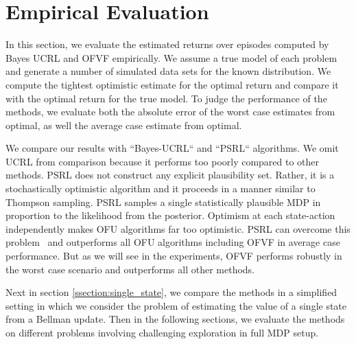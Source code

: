 \documentclass{article}
\theoremstyle{plain}
\theoremstyle{definition}
\begin{document}
\section{Empirical Evaluation} \label{sec:experiments}

In this section, we evaluate the estimated returns over episodes computed by Bayes UCRL and OFVF empirically. We assume a true model of each problem and generate a number of simulated data sets for the known distribution. We compute the tightest optimistic estimate for the optimal return and compare it with the optimal return for the true model. To judge the performance of the methods, we evaluate both the absolute error of the worst case estimates from optimal, as well the average case estimate from optimal.

We compare our results with ``Bayes-UCRL`` and ``PSRL`` algorithms. We omit UCRL from comparison because it performs too poorly compared to other methods. PSRL does not construct any explicit plausibility set. Rather, it is a stochastically optimistic algorithm and it proceeds in a manner similar to Thompson sampling. PSRL samples a single statistically plausible MDP in proportion to the likelihood from the posterior. Optimism at each state-action independently makes OFU algorithms far too optimistic. PSRL can overcome this problem~\cite{Osband2016} and outperforms all OFU algorithms including OFVF in average case performance. But as we will see in the experiments, OFVF performs robustly in the worst case scenario and outperforms all other methods.

Next in section \cref{ssection:single_state}, we compare the methods in a simplified setting in which we consider the problem of estimating the value of a single state from a Bellman update. Then in the following sections, we evaluate the methods on different problems involving challenging exploration in full MDP setup.
\end{document}
